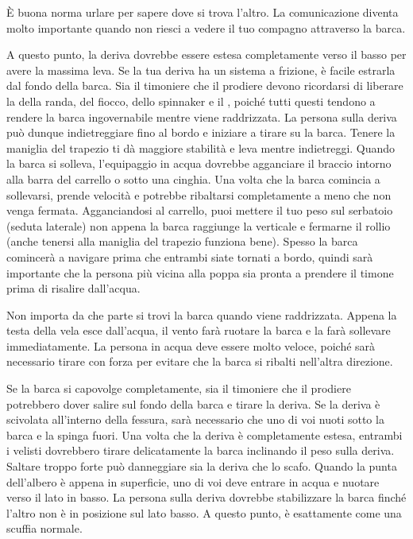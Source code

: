 È buona norma urlare per sapere dove si trova l'altro. La comunicazione
diventa molto importante quando non riesci a vedere il tuo compagno attraverso
la barca.

A questo punto, la deriva dovrebbe essere estesa completamente verso il basso
per avere la massima leva. Se la tua deriva ha un sistema a frizione, è facile
estrarla dal fondo della barca. Sia il timoniere che il prodiere devono
ricordarsi di liberare la \sheet della randa, del fiocco, dello spinnaker e il
\vang, poiché tutti questi tendono a rendere la barca ingovernabile mentre viene
raddrizzata. La persona sulla deriva può dunque indietreggiare fino al bordo e
iniziare a tirare su la barca. Tenere la maniglia del trapezio ti dà maggiore
stabilità e leva mentre indietreggi. Quando la barca si solleva, l'equipaggio in
acqua dovrebbe agganciare il braccio intorno alla barra del carrello o sotto una
cinghia. Una volta che la barca comincia a sollevarsi, prende velocità e
potrebbe ribaltarsi completamente a meno che non venga fermata. Agganciandosi al
carrello, puoi mettere il tuo peso sul serbatoio (seduta laterale) non appena la
barca raggiunge la verticale e fermarne il rollio (anche tenersi alla maniglia
del trapezio funziona bene). Spesso la barca comincerà a navigare prima che
entrambi siate tornati a bordo, quindi sarà importante che la persona più vicina
alla poppa sia pronta a prendere il timone prima di risalire dall'acqua.

Non importa da che parte si trovi la barca quando viene raddrizzata. Appena la
testa della vela esce dall'acqua, il vento farà ruotare la barca e la farà
sollevare immediatamente. La persona in acqua deve essere molto veloce, poiché
sarà necessario tirare con forza per evitare che la barca si ribalti nell'altra
direzione.

Se la barca si capovolge completamente, sia il timoniere che il prodiere
potrebbero dover salire sul fondo della barca e tirare la deriva. Se la deriva è
scivolata all'interno della fessura, sarà necessario che uno di voi nuoti sotto
la barca e la spinga fuori. Una volta che la deriva è completamente estesa,
entrambi i velisti dovrebbero tirare delicatamente la barca inclinando il peso
sulla deriva. Saltare troppo forte può danneggiare sia la deriva che lo scafo.
Quando la punta dell'albero è appena in superficie, uno di voi deve entrare in
acqua e nuotare verso il lato in basso. La persona sulla deriva dovrebbe
stabilizzare la barca finché l'altro non è in posizione sul lato basso. A questo
punto, è esattamente come una scuffia normale.

